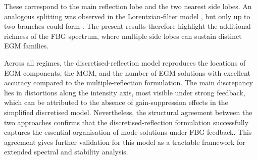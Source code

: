 These correspond to the main reflection lobe and the two nearest side lobes.
An analogous splitting was observed in the Lorentzian-filter model \cite{yousefi1999dynamical}, but only up to two branches could form \cite{green2006mode}.
The present results therefore highlight the additional richness of the FBG spectrum, where multiple side lobes can sustain distinct EGM families.
%
\par
%
Across all regimes, the discretised-reflection model reproduces the locations of EGM components, the MGM, and the number of EGM solutions with excellent accuracy compared to the multiple-reflection formulation.
The main discrepancy lies in distortions along the intensity axis, most visible under strong feedback, which can be attributed to the absence of gain-suppression effects in the simplified discretised model.
Nevertheless, the structural agreement between the two approaches confirms that the discretised-reflection formulation successfully captures the essential organisation of mode solutions under FBG feedback.
This agreement gives further validation for this model as a tractable framework for extended spectral and stability analysis.
%

